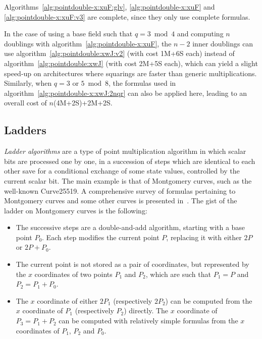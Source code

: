 \documentclass{llncs}
\begin{document}
Algorithms~\ref{alg:pointdouble-x:xuF:glv}, \ref{alg:pointdouble-x:xuF}
and \ref{alg:pointdouble-x:xuF:v3} are complete, since they only use
complete formulas.

In the case of using a base field such that $q = 3\bmod 4$ and computing
$n$ doublings with algorithm~\ref{alg:pointdouble-x:xuF}, the $n-2$
inner doublings can use algorithm~\ref{alg:pointdouble:xwJ:v2} (with
cost 1M+6S each) instead of algorithm~\ref{alg:pointdouble:xwJ} (with
cost 2M+5S each), which can yield a slight speed-up on architectures
where squarings are faster than generic multiplications. Similarly, when
$q = 3$ or $5\bmod 8$, the formulas used in
algorithm~\ref{alg:pointdouble-x:xwJ:2nqr} can also be applied here,
leading to an overall cost of $n$(4M+2S)+2M+2S.

\subsection{Ladders}\label{sec:algorithms:ladders}

\emph{Ladder algorithms} are a type of point multiplication algorithm in
which scalar bits are processed one by one, in a succession of steps
which are identical to each other save for a conditional exchange of
some state values, controlled by the current scalar bit. The main
example is that of Montgomery curves, such as the well-known
Curve25519\cite{Ber2006}. A comprehensive survey of formulas pertaining
to Montgomery curves and some other curves is presented
in~\cite{CosSmi2018}. The gist of the ladder on Montgomery curves is the
following:
\begin{itemize}

    \item The successive steps are a double-and-add algorithm, starting
    with a base point $P_0$. Each step modifies the current point $P$,
    replacing it with either $2P$ or $2P+P_0$.

    \item The current point is not stored as a pair of coordinates,
    but represented by the $x$ coordinates of two points $P_1$ and
    $P_2$, which are such that $P_1 = P$ and $P_2 = P_1 + P_0$.

    \item The $x$ coordinate of either $2P_1$ (respectively $2P_2$) can
    be computed from the $x$ coordinate of $P_1$ (respectively $P_2$)
    directly. The $x$ coordinate of $P_3 = P_1 + P_2$ can be computed
    with relatively simple formulas from the $x$ coordinates of $P_1$,
    $P_2$ and $P_0$.

\end{itemize}
\end{document}
